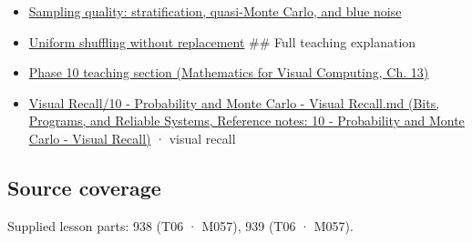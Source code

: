 \begin{itemize}
\item
  \hyperref[appendix-9f693ffd82bc]{Sampling quality: stratification, quasi-Monte Carlo, and blue noise}
\item
  \hyperref[appendix-184fcc411663]{Uniform shuffling without replacement} \#\# Full teaching explanation
\item
  \href{../02-Mathematics-for-Visual-Computing/main.pdf\#nameddest=02-foundations-ii-ch029-a-computer-produces-deterministic-pseudorandom-sequences}{Phase 10 teaching section (Mathematics for Visual Computing, Ch. 13)}
\item
  \href{../01-Bits-Programs-and-Reliable-Systems/main.pdf\#nameddest=appendix-cb5af353ef77}{Visual Recall/10 - Probability and Monte Carlo - Visual Recall.md (Bits, Programs, and Reliable Systems, Reference notes: 10 - Probability and Monte Carlo - Visual Recall)} · visual recall
\end{itemize}

\subsection{Source coverage}\label{appendix-daaf25bfd3a0-source-coverage}

Supplied lesson parts: 938 (T06 · M057), 939 (T06 · M057).
